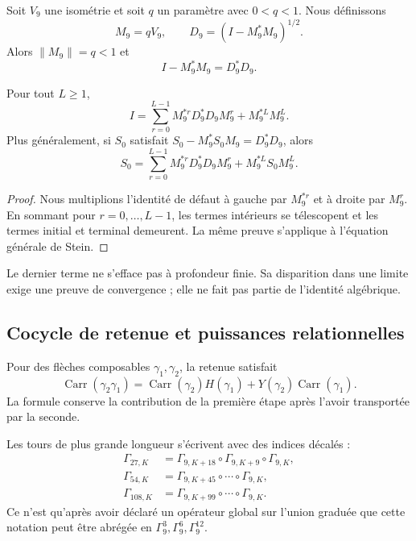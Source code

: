 Soit \(V_9\) une isométrie et soit \(q\) un paramètre avec \(0<q<1\). Nous définissons
\[
 M_9=qV_9,
 \qquad
 D_9=(I-M_9^*M_9)^{1/2}.
\]
Alors \(\|M_9\|=q<1\) et
\[
 I-M_9^*M_9=D_9^*D_9.
\]

\begin{theorem}
\label{p12-83-c7-s1:thm:stein-telescopia-terminal}
Pour tout \(L\geq1\),
\[
 \boxed{
 I=
 \sum_{r=0}^{L-1}M_9^{*r}D_9^*D_9M_9^r
 +M_9^{*L}M_9^L.}
\]
Plus généralement, si \(S_0\) satisfait
\(S_0-M_9^*S_0M_9=D_9^*D_9\), alors
\[
 \boxed{
 S_0=
 \sum_{r=0}^{L-1}M_9^{*r}D_9^*D_9M_9^r
 +M_9^{*L}S_0M_9^L.}
\]
\end{theorem}

\begin{proof}
Nous multiplions l'identité de défaut à gauche par \(M_9^{*r}\) et à
droite par \(M_9^r\). En sommant pour \(r=0,\ldots,L-1\), les termes
intérieurs se télescopent et les termes initial et terminal demeurent. La même preuve
s'applique à l'équation générale de Stein.
\end{proof}

Le dernier terme ne s'efface pas à profondeur finie. Sa disparition dans une
limite exige une preuve de convergence ; elle ne fait pas partie de l'identité
algébrique.

\subsection{Cocycle de retenue et puissances relationnelles}

Pour des flèches composables \(\gamma_1,\gamma_2\), la retenue satisfait
\[
 \operatorname{Carr}(\gamma_2\gamma_1)
 =\operatorname{Carr}(\gamma_2)H(\gamma_1)
 +Y(\gamma_2)\operatorname{Carr}(\gamma_1).
\]
La formule conserve la contribution de la première étape après
l'avoir transportée par la seconde.

Les tours de plus grande longueur s'écrivent avec des indices décalés :
\begin{align*}
 \Gamma_{27,K}
 &=\Gamma_{9,K+18}\circ\Gamma_{9,K+9}\circ\Gamma_{9,K},\\
 \Gamma_{54,K}
 &=\Gamma_{9,K+45}\circ\cdots\circ\Gamma_{9,K},\\
 \Gamma_{108,K}
 &=\Gamma_{9,K+99}\circ\cdots\circ\Gamma_{9,K}.
\end{align*}
Ce n'est qu'après avoir déclaré un opérateur global sur l'union graduée que
cette notation peut être abrégée en \(\Gamma_9^3,\Gamma_9^6,\Gamma_9^{12}\).


